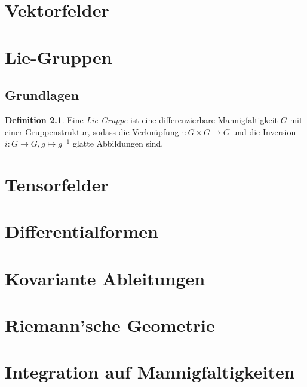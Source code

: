 \documentclass[a4paper]{scrreprt}
\numberwithin{equation}{chapter}
\theoremstyle{definition}
\newtheorem{defn}{Definition}[section]
\begin{document}
\chapter{Vektorfelder}


\chapter{Lie-Gruppen}
	\section{Grundlagen}
		\begin{defn}
			Eine \emph{Lie-Gruppe} ist eine differenzierbare Mannigfaltigkeit $G$ mit einer Gruppenstruktur, sodass die Verknüpfung $\cdot\colon G\times G\rightarrow G$ und die Inversion $i\colon G\rightarrow G, g\mapsto g^{-1}$ glatte Abbildungen sind.
		\end{defn}

\chapter{Tensorfelder}


\chapter{Differentialformen}


\chapter{Kovariante Ableitungen}


\chapter{Riemann'sche Geometrie}


\chapter{Integration auf Mannigfaltigkeiten}
\end{document}
